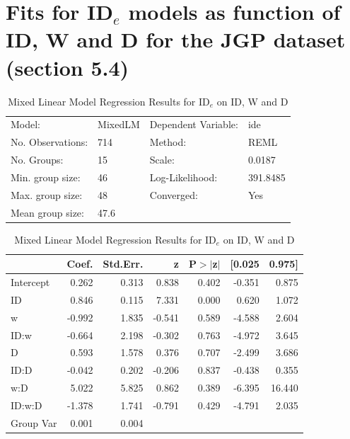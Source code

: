 \documentclass{article}
\begin{document}
\section{Fits for ID$_e$ models as function of ID, W and D for the JGP dataset (section 5.4)}
\begin{table}
	\caption{Mixed Linear Model Regression Results for ID$_e$ on ID, W and D}
	\label{tab:fit_jgp_ide_id_full}
	\begin{center}
		\begin{tabular}{llll}
			\hline
			Model:            & MixedLM & Dependent Variable: & ide       \\
			No. Observations: & 714     & Method:             & REML      \\
			No. Groups:       & 15      & Scale:              & 0.0187    \\
			Min. group size:  & 46      & Log-Likelihood:     & 391.8485  \\
			Max. group size:  & 48      & Converged:          & Yes       \\
			Mean group size:  & 47.6    &                     &           \\
			\hline
			\end{tabular}
			\end{center}
			
			\begin{center}
			\begin{tabular}{lrrrrrr}
			\hline
					  &  Coef. & Std.Err. &      z & P$> |$z$|$ & [0.025 & 0.975]  \\
			\hline
			Intercept &  0.262 &    0.313 &  0.838 &       0.402 & -0.351 &  0.875  \\
			ID        &  0.846 &    0.115 &  7.331 &       0.000 &  0.620 &  1.072  \\
			w         & -0.992 &    1.835 & -0.541 &       0.589 & -4.588 &  2.604  \\
			ID:w      & -0.664 &    2.198 & -0.302 &       0.763 & -4.972 &  3.645  \\
			D         &  0.593 &    1.578 &  0.376 &       0.707 & -2.499 &  3.686  \\
			ID:D      & -0.042 &    0.202 & -0.206 &       0.837 & -0.438 &  0.355  \\
			w:D       &  5.022 &    5.825 &  0.862 &       0.389 & -6.395 & 16.440  \\
			ID:w:D    & -1.378 &    1.741 & -0.791 &       0.429 & -4.791 &  2.035  \\
			Group Var &  0.001 &    0.004 &        &             &        &         \\
			\hline
			\end{tabular}
			\end{center}
			\end{table}
\end{document}
